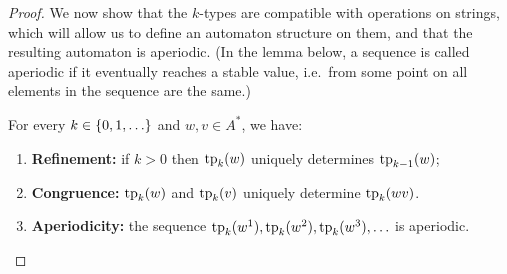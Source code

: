\begin{proof}
We now show that the $k$-types are compatible with operations on strings, which will allow us to define an automaton structure on them, and that the resulting automaton is aperiodic. (In the lemma below, a sequence is called aperiodic if it eventually reaches a stable value, i.e.~from some point on all elements in the sequence are the same.)

    \begin{lemma}\label{lem:k-types-properties}
        For every $k \in \{0,1,\ldots\}$ and $w, v \in A^*$, we have:
            \begin{enumerate}
        \item \label{item:fo-types-more-information} \textbf{Refinement:} if $k > 0$ then $\text{tp}_k(w)$ uniquely determines  $\text{tp}_{k-1}(w)$;
        \item  \textbf{Congruence:} \label{item:fo-types-congruence} $\text{tp}_k(w)$ and $\text{tp}_k(v)$ uniquely determine  $\text{tp}_k(w v)$.
        \item \textbf{Aperiodicity:} \label{item:fo-types-aperiodic} the sequence $\text{tp}_k(w^1), \text{tp}_k(w^2), \text{tp}_k(w^3), \ldots$ is aperiodic.
    \end{enumerate}
    \end{lemma}


\end{proof}
